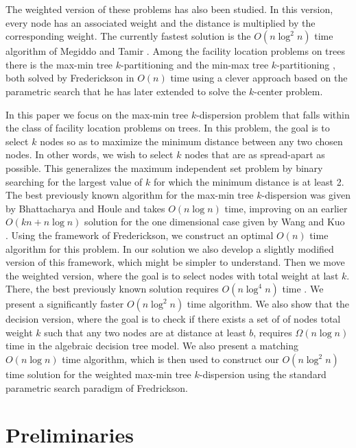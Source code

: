 \documentclass[11pt,a4paper]{article}
\newcommand{\Oh}{{O}}
\theoremstyle{definition}
\theoremstyle{remark}
\begin{document}
The weighted version
of these problems has also been studied. In this version, every node has an associated weight and the
distance is multiplied by the corresponding weight. The currently fastest solution is the $\Oh(n\log^2n)$ time algorithm of Megiddo and Tamir %
\cite{Megiddo1983}. Among the facility location problems on trees there
is the max-min tree $k$-partitioning \cite{Perl1981} and the min-max tree
$k$-partitioning \cite{Becker1982}, both solved by Frederickson in $\Oh(n)$ time
\cite{Frederickson1991} using a clever approach based on the parametric search that
he has later extended to solve the $k$-center problem.

In this paper we focus on the max-min tree $k$-dispersion problem that falls within the class of facility
location problems on trees. In this problem, the goal
is to select $k$ nodes so as to maximize the minimum distance between any
two chosen nodes. In other words, we wish to select $k$ nodes that are as spread-apart as possible. 
This generalizes the maximum independent set
problem by binary searching for the largest value of $k$ for which the
minimum distance is at least 2. The best previously known algorithm
for the max-min tree $k$-dispersion was given by Bhattacharya and Houle
\cite{Bhattacharya1991} and takes $\Oh(n\log n)$ time, improving on an earlier $\Oh(kn+n\log n)$
solution for the one dimensional case given by Wang and Kuo~\cite{Wang1988} . Using the
framework of Frederickson, we construct an optimal $\Oh(n)$ time algorithm
for this problem. In our solution we also develop a slightly modified
version of this framework, which might be simpler to understand. Then
we move the weighted version, where the goal is to select nodes with
 total weight  at last $k$. There, the best previously known
solution requires $\Oh(n\log^4 n)$ time \cite{Bhattacharya1991}. We present a significantly
faster $\Oh(n\log^2 n)$ time algorithm. We also show that the decision
version, where the goal is to check if there exists a set of of nodes
total weight $k$ such that any two nodes are at distance at least $b$,
requires $\Omega(n\log n)$ time in the algebraic decision tree model. We
also present a matching $\Oh(n\log n)$ time algorithm, which is then used
to construct our $\Oh(n\log^2n)$ time solution for the weighted max-min
tree $k$-dispersion using the standard parametric search paradigm of Fredrickson. 

\section{Preliminaries}
\end{document}
